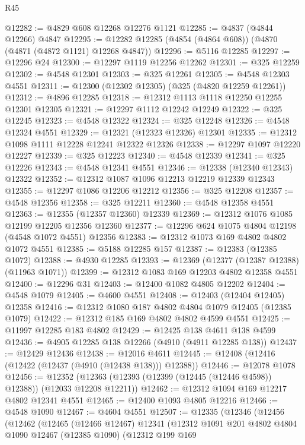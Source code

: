 \begin{lexlean}{R45}
\begin{coremodule}
@12282 := @4829 @608 @12268 @12276 @1121
@12285 := @4837 (@4844 @12266) @4847
@12295 := @12282 @12285 (@4854 (@4864 @608)) (@4870 (@4871 (@4872 @1121) @12268 @4847))
@12296 := @5116 @12285
@12297 := @12296 @24
@12300 := @12297 @1119 @12256 @12262
@12301 := @325 @12259
@12302 := @4548 @12301
@12303 := @325 @12261
@12305 := @4548 @12303 @4551
@12311 := @12300 (@12302 @12305) (@325 (@4820 @12259 @12261))
@12312 := @4896 @12285
@12318 := @12312 @1113 @1118 @12250 @12255 @12301 @12305
@12321 := @12297 @1112 @12242 @12249
@12322 := @325 @12245
@12323 := @4548 @12322
@12324 := @325 @12248
@12326 := @4548 @12324 @4551
@12329 := @12321 (@12323 @12326) @12301
@12335 := @12312 @1098 @1111 @12228 @12241 @12322 @12326
@12338 := @12297 @1097 @12220 @12227
@12339 := @325 @12223
@12340 := @4548 @12339
@12341 := @325 @12226
@12343 := @4548 @12341 @4551
@12346 := @12338 (@12340 @12343) @12322
@12352 := @12312 @1087 @1096 @12213 @12219 @12339 @12343
@12355 := @12297 @1086 @12206 @12212
@12356 := @325 @12208
@12357 := @4548 @12356
@12358 := @325 @12211
@12360 := @4548 @12358 @4551
@12363 := @12355 (@12357 @12360) @12339
@12369 := @12312 @1076 @1085 @12199 @12205 @12356 @12360
@12377 := @12296 @624 @1075 @4804 @12198 (@4548 @1072 @4551) @12356
@12383 := @12312 @1073 @169 @4802 @4802 @1072 @4551
@12385 := @5188 @12285 @157
@12387 := @12383 (@12385 @1072)
@12388 := @4930 @12285
@12393 := @12369 (@12377 (@12387 @12388) (@11963 @1071))
@12399 := @12312 @1083 @169 @12203 @4802 @12358 @4551
@12400 := @12296 @31
@12403 := @12400 @1082 @4805 @12202
@12404 := @4548 @1079
@12405 := @4600 @4551
@12408 := @12403 (@12404 @12405) @12358
@12416 := @12312 @1080 @187 @4802 @4804 @1079 @12405 (@12385 @1079)
@12422 := @12312 @185 @169 @4802 @4802 @4599 @4551
@12425 := @11997 @12285 @183 @4802
@12429 := @12425 @138 @4611 @138 @4599
@12436 := @4905 @12285 @138 @12266 (@4910 (@4911 @12285 @138))
@12437 := @12429 @12436
@12438 := @12016 @4611
@12445 := @12408 (@12416 (@12422 (@12437 (@4910 (@12438 @138))) @12388))
@12446 := @12078 @1078
@12456 := @12352 (@12363 (@12393 (@12399 (@12445 (@12446 @4598)) @12388)) (@12033 @12208 @12211))
@12462 := @12312 @1094 @169 @12217 @4802 @12341 @4551
@12465 := @12400 @1093 @4805 @12216
@12466 := @4548 @1090
@12467 := @4604 @4551
@12507 := @12335
    (@12346
      (@12456
        (@12462
          (@12465
            (@12466 @12467)
            @12341
            (@12312
              @1091
              @201
              @4802
              @4804
              @1090
              @12467
              (@12385 @1090)
              (@12312
                @199
                @169

\end{coremodule}
\end{lexlean}
